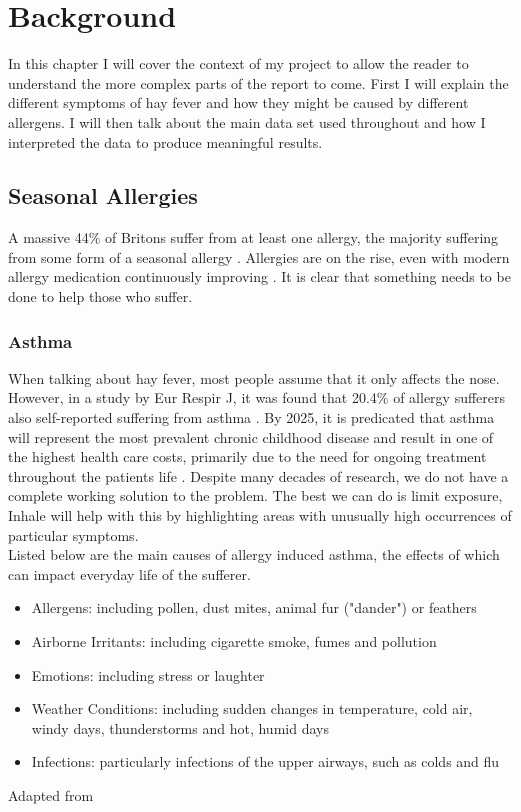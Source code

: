 \chapter{Background}
\label{cha:back}

In this chapter I will cover the context of my project to allow the reader to understand the more complex parts of the report to come. First I will explain the different symptoms of hay fever and how they might be caused by different allergens. I will then talk about the main data set used throughout and how I interpreted the data to produce meaningful results.

\section{Seasonal Allergies}
A massive 44\% of Britons suffer from at least one allergy, the majority suffering from some form of a seasonal allergy \cite{mintelallergy}. Allergies are on the rise, even with modern allergy medication continuously improving \cite{mintelallergy}. It is clear that something needs to be done to help those who suffer.\\


\subsection{Asthma}
When talking about hay fever, most people assume that it only affects the nose. However, in a study by Eur Respir J, it was found that 20.4\% of allergy sufferers also self-reported suffering from asthma \cite{rhinitis}. By 2025, it is predicated that asthma will represent the most prevalent chronic childhood disease and result in one of the highest health care costs, primarily due to the need for ongoing treatment throughout the patients life \cite{childhood}. Despite many decades of research, we do not have a complete working solution to the problem. The best we can do is limit exposure, Inhale will help with this by highlighting areas with unusually high occurrences of particular symptoms.\\

Listed below are the main causes of allergy induced asthma, the effects of which can impact everyday life of the sufferer.\\


\begin{itemize}
  \item Allergens: including pollen, dust mites, animal fur ("dander") or feathers
  \item Airborne Irritants: including cigarette smoke, fumes and pollution
  \item Emotions: including stress or laughter
  \item Weather Conditions: including sudden changes in temperature, cold air, windy days, thunderstorms and hot, humid days
  \item Infections: particularly infections of the upper airways, such as colds and flu
\end{itemize}\begin{center}Adapted from \cite{urlasthmacauses}\end{center}

